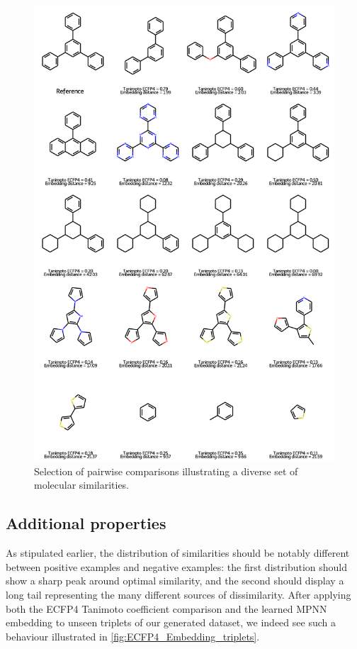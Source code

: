 \documentclass[journal=jacsat,manuscript=article]{achemso}
\begin{document}
\begin{figure}[hbtp]
\centering
\includegraphics[height=\textheight]{data/Similarity_study_cases.pdf}
\caption{Selection of pairwise comparisons illustrating a diverse set of molecular similarities.}
\label{fig:Similarity_study_cases}
\end{figure}


\subsection{Additional properties}
As stipulated earlier, the distribution of similarities should be notably different between positive examples and negative examples: the first distribution should show a sharp peak around optimal similarity, and the second should display a long tail representing the many different sources of dissimilarity. After applying both the ECFP4 Tanimoto coefficient comparison and the learned MPNN embedding to unseen triplets of our generated dataset, we indeed see such a behaviour illustrated in \ref{fig:ECFP4_Embedding_triplets}.
\end{document}
